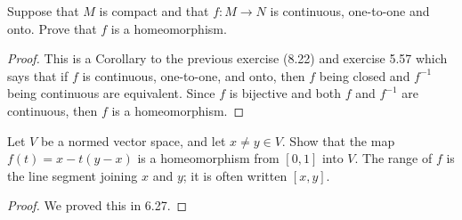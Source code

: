 \begin{exercise}{23}
Suppose that $M$ is compact and that $f:M\to N$ is continuous, one-to-one and onto.
Prove that $f$ is a homeomorphism.
\end{exercise}
\begin{proof}
This is a Corollary to the previous exercise (8.22) and exercise 5.57 which says that if $f$ is continuous, one-to-one, and onto, then $f$ being closed and $f^{-1}$ being continuous are equivalent.
Since $f$ is bijective and both $f$ and $f^{-1}$ are continuous, then $f$ is a homeomorphism.
\end{proof} 

\begin{exercise}{25}
Let $V$ be a normed vector space, and let $x\neq y\in V$.
Show that the map $f(t)=x-t(y-x)$ is a homeomorphism from $[0,1]$ into $V$.
The range of $f$ is the line segment joining $x$ and $y$;
it is often written $[x,y]$.
\end{exercise}
\begin{proof}
We proved this in 6.27.
\end{proof} 


